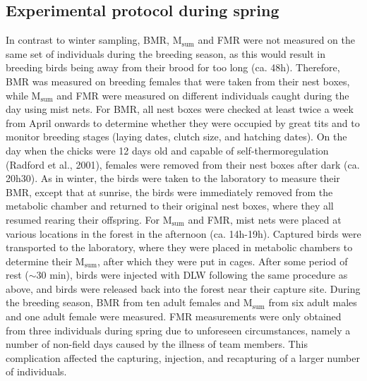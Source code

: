 \documentclass[10pt, twoside]{book} %
\begin{document}
\subsection{Experimental protocol during spring}
In contrast to winter sampling, BMR, M$_{\text{sum}}$ and FMR were not measured on the same set of individuals during the breeding season, as this would result in breeding birds being away from their brood for too long (ca. 48h). Therefore, BMR was measured on breeding females that were taken from their nest boxes, while M$_{\text{sum}}$ and FMR were measured on different individuals caught during the day using mist nets. For BMR, all nest boxes were checked at least twice a week from April onwards to determine whether they were occupied by great tits and to monitor breeding stages (laying dates, clutch size, and hatching dates). On the day when the chicks were 12 days old and capable of self-thermoregulation (Radford et al., 2001), females were removed from their nest boxes after dark (ca. 20h30). As in winter, the birds were taken to the laboratory to measure their BMR, except that at sunrise, the birds were immediately removed from the metabolic chamber and returned to their original nest boxes, where they all resumed rearing their offspring. For M$_{\text{sum}}$ and FMR, mist nets were placed at various locations in the forest in the afternoon (ca. 14h-19h). Captured birds were transported to the laboratory, where they were placed in metabolic chambers to determine their M$_{\text{sum}}$, after which they were put in cages. After some period of rest ($\sim$30 min), birds were injected with DLW following the same procedure as above, and birds were released back into the forest near their capture site. During the breeding season, BMR from ten adult females and M$_{\text{sum}}$ from six adult males and one adult female were measured. FMR measurements were only obtained from three individuals during spring due to unforeseen circumstances, namely a number of non-field days caused by the illness of team members. This complication affected the capturing, injection, and recapturing of a larger number of individuals.
\end{document}
